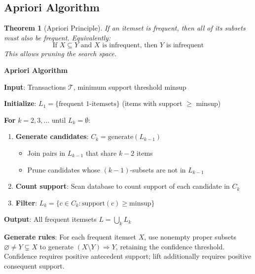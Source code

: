 \documentclass[11pt,twoside]{article}
\numberwithin{equation}{section}
\theoremstyle{plain}
\newtheorem{theorem}{Theorem}[section]
\theoremstyle{definition}
\theoremstyle{remark}
\begin{document}
\subsection{Apriori Algorithm}

\begin{theorem}[Apriori Principle]
If an itemset is frequent, then all of its subsets must also be frequent. Equivalently:
\[
\text{If }X\subseteq Y\text{ and }X\text{ is infrequent, then }Y\text{ is infrequent}
\]
This allows pruning the search space.
\end{theorem}

\begin{algorithmbox}
\textbf{Apriori Algorithm}

\textbf{Input}: Transactions $\mathcal{T}$, minimum support threshold $\text{minsup}$

\textbf{Initialize}: $L_1 = \{\text{frequent 1-itemsets}\}$ (items with support $\geq$ minsup)

\textbf{For} $k = 2, 3, \ldots$ until $L_k = \emptyset$:
\begin{enumerate}
\item \textbf{Generate candidates}: $C_k = \text{generate}(L_{k-1})$
\begin{itemize}
\item Join pairs in $L_{k-1}$ that share $k-2$ items
\item Prune candidates whose $(k-1)$-subsets are not in $L_{k-1}$
\end{itemize}

\item \textbf{Count support}: Scan database to count support of each candidate in $C_k$

\item \textbf{Filter}: $L_k = \{c \in C_k : \text{support}(c) \geq \text{minsup}\}$
\end{enumerate}

\textbf{Output}: All frequent itemsets $L = \bigcup_k L_k$

\textbf{Generate rules}: For each frequent itemset $X$, use nonempty proper subsets $\varnothing\ne Y\subsetneq X$ to generate $(X\setminus Y)\Rightarrow Y$, retaining the confidence threshold. Confidence requires positive antecedent support; lift additionally requires positive consequent support.
\end{algorithmbox}
\end{document}
